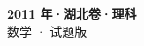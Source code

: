 \documentclass[zihao=-4, a4paper]{ctexart}
\begin{document}
\begin{center}
  {\Large\bfseries 2011 年·湖北卷·理科}\\[4pt]
  {\large 数学 · 试题版}
\end{center}
\medskip
{}

\end{document}
